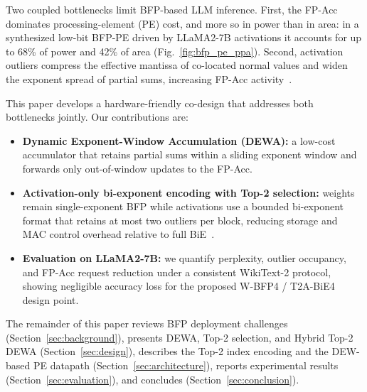 Two coupled bottlenecks limit BFP-based LLM inference.
First, the FP-Acc dominates processing-element (PE) cost, and more so in power than in area: in a synthesized low-bit BFP-PE driven by LLaMA2-7B activations it accounts for up to 68\% of power and 42\% of area (Fig.~\ref{fig:bfp_pe_ppa}).
Second, activation outliers compress the effective mantissa of co-located normal values and widen the exponent spread of partial sums, increasing FP-Acc activity~\cite{bie2024,ees2025,oiso2026,bbal2025,harmonia2026}.

This paper develops a hardware-friendly co-design that addresses both bottlenecks jointly.
Our contributions are:
\begin{itemize}
    \item \textbf{Dynamic Exponent-Window Accumulation (DEWA):} a low-cost accumulator that retains partial sums within a sliding exponent window and forwards only out-of-window updates to the FP-Acc.
    \item \textbf{Activation-only bi-exponent encoding with Top-2 selection:} weights remain single-exponent BFP while activations use a bounded bi-exponent format that retains at most two outliers per block, reducing storage and MAC control overhead relative to full BiE~\cite{bie2024,oiso2026}.
    \item \textbf{Evaluation on LLaMA2-7B:} we quantify perplexity, outlier occupancy, and FP-Acc request reduction under a consistent WikiText-2 protocol, showing negligible accuracy loss for the proposed W-BFP4 / T2A-BiE4 design point.
\end{itemize}

The remainder of this paper reviews BFP deployment challenges (Section~\ref{sec:background}), presents DEWA, Top-2 selection, and Hybrid Top-2 DEWA (Section~\ref{sec:design}), describes the Top-2 index encoding and the DEW-based PE datapath (Section~\ref{sec:architecture}), reports experimental results (Section~\ref{sec:evaluation}), and concludes (Section~\ref{sec:conclusion}).

